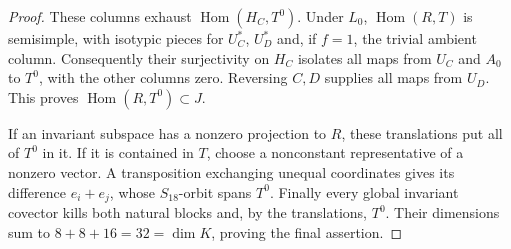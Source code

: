 \begin{proof}
These columns exhaust $\operatorname{Hom}(H_C,T^0)$. Under $L_0$,
$\operatorname{Hom}(R,T)$ is semisimple, with isotypic pieces
for $U_C^*$, $U_D^*$ and, if $f=1$, the trivial ambient column.
Consequently their surjectivity on $H_C$ isolates all maps from
$U_C$ and $A_0$ to $T^0$, with the other columns zero. Reversing
$C,D$ supplies all maps from $U_D$. This proves
$\operatorname{Hom}(R,T^0)\subset J$.

If an invariant subspace has a nonzero projection to $R$, these
translations put all of $T^0$ in it. If it is contained in $T$,
choose a nonconstant representative of a nonzero vector. A
transposition exchanging unequal coordinates gives its difference
$e_i+e_j$, whose $S_{18}$-orbit spans $T^0$.
Finally every global invariant covector kills both natural
blocks and, by the translations, $T^0$. Their dimensions sum
to $8+8+16=32=\dim K$, proving the final assertion.
\end{proof}

